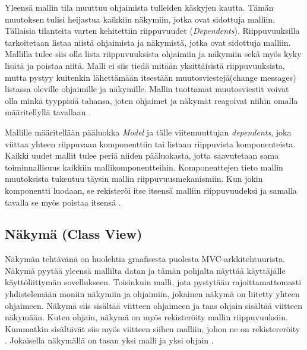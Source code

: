 \documentclass[finnish,utf8,nonumbib,palatino,kandi]{gradu2}
\begin{document}
Yleensä mallin tila muuttuu ohjaimista tulleiden käskyjen kautta. Tämän muutoksen tulisi heijastua kaikkiin näkymiin, jotka ovat sidottuja malliin. Tällaisia tilanteita varten kehitettiin riippuvuudet (\emph{Dependents}).
Riippuvuuksilla tarkoitetaan listaa niistä ohjaimista ja näkymistä, jotka ovat sidottuja malliin. Mallilla tulee siis olla lista riippuvuuksista ohjaimiin ja näkymiin sekä myös kyky lisätä ja poistaa niitä. Malli ei siis tiedä mitään yksittäisistä riippuvuuksista, mutta pystyy kuitenkin lähettämään itsestään muutosviestejä(change messages) listassa oleville ohjaimille ja näkymille. Mallin tuottamat muutosviestit voivat olla minkä tyyppisiä tahansa, joten ohjaimet ja näkymät reagoivat niihin omalla määritellyllä tavallaan  \cite[s.2-3]{Krasner}. 

Mallille määritellään pääluokka \emph{Model} ja tälle viitemuuttujan \emph{dependents}, joka viittaa yhteen riippuvaan komponenttiin tai listaan riippuvista komponenteista. Kaikki uudet mallit tulee periä niiden pääluokasta, jotta saavutetaan sama toiminnallisuus kaikkiin mallikomponentteihin. Komponenttejen tieto mallin muutoksista tukeutuu täysin mallin riippuvuusmekanismiin. Kun jokin komponentti luodaan, se rekisteröi itse itsensä malliin riippuvuudeksi ja samalla tavalla se myös poistaa itsensä \cite{Burbeck}.

\subsection{Näkymä (Class View)}
Näkymän tehtävänä on huolehtia graafisesta puolesta MVC-arkkitehtuurista. Näkymä pyytää yleensä mallilta datan ja tämän pohjalta näyttää käyttäjälle käyttöliittymän sovellukseen. Toisinkuin malli, jota pystytään rajoittamattomasti yhdistelemään moniin näkymiin ja ohjaimiin, jokainen näkymä on liitetty yhteen ohjaimeen.  Näkymä siis sisältää viitteen ohjaimeen ja taas ohjain sisältää viitteen näkymään. Kuten ohjain, näkymä on myös rekisteröity mallin riippuvuuksiin. Kummatkin sisältävät siis myös viitteen siihen malliin, johon ne on rekistereröity \cite{Burbeck}. Jokaisella näkymällä on tasan yksi malli ja yksi ohjain \cite[s. 7]{Krasner:desc}.  
\end{document}
